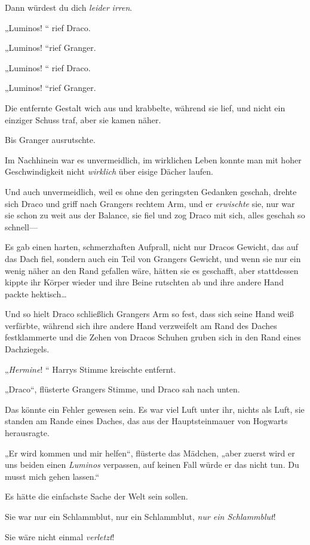 {Dann würdest du dich \emph{leider} \emph{irren}.

„Luminos! “ rief Draco.

„Luminos! “rief Granger.

„Luminos! “ rief Draco.

„Luminos! “rief Granger.

Die entfernte Gestalt wich aus und krabbelte, während sie lief, und nicht ein einziger Schuss traf, aber sie kamen näher.

Bis Granger ausrutschte.

Im Nachhinein war es unvermeidlich, im wirklichen Leben konnte man mit hoher Geschwindigkeit nicht \emph{wirklich} über eisige Dächer laufen.

Und auch unvermeidlich, weil es ohne den geringsten Gedanken geschah, drehte sich Draco und griff nach Grangers rechtem Arm, und er \emph{erwischte} sie, nur war sie schon zu weit aus der Balance, sie fiel und zog Draco mit sich, alles geschah so schnell—

Es gab einen harten, schmerzhaften Aufprall, nicht nur Dracos Gewicht, das auf das Dach fiel, sondern auch ein Teil von Grangers Gewicht, und wenn sie nur ein wenig näher an den Rand gefallen wäre, hätten sie es geschafft, aber stattdessen kippte ihr Körper wieder und ihre Beine rutschten ab und ihre andere Hand packte hektisch…

Und so hielt Draco schließlich Grangers Arm so fest, dass sich seine Hand weiß verfärbte, während sich ihre andere Hand verzweifelt am Rand des Daches festklammerte und die Zehen von Dracos Schuhen gruben sich in den Rand eines Dachziegels.

„\emph{Hermine}! “ Harrys Stimme kreischte entfernt.

„Draco“, flüsterte Grangers Stimme, und Draco sah nach unten.

Das könnte ein Fehler gewesen sein. Es war viel Luft unter ihr, nichts als Luft, sie standen am Rande eines Daches, das aus der Hauptsteinmauer von Hogwarts herausragte.

„Er wird kommen und mir helfen“, flüsterte das Mädchen, „aber zuerst wird er uns beiden einen \emph{Luminos} verpassen, auf keinen Fall würde er das nicht tun. Du musst mich gehen lassen.“

Es hätte die einfachste Sache der Welt sein sollen.

Sie war nur ein Schlammblut, nur ein Schlammblut, \emph{nur ein Schlammblut}!

Sie wäre nicht einmal \emph{verletzt}!

}
